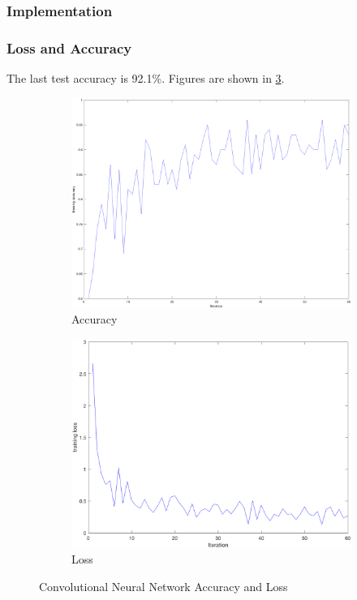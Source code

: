 \subsubsection{Implementation}

\subsubsection{Loss and Accuracy}
The last test accuracy is 92.1\%.
Figures are shown in \ref{fig:27}.
\begin{figure}[htbp]
	\centering
	\begin{subfigure}[t]{0.8\textwidth}
	    \centering
        \includegraphics[width=\textwidth]{hw6/accuracy3.png}
		\caption{Accuracy}\label{fig:27a}
	\end{subfigure}
	\begin{subfigure}[t]{0.8\textwidth}
	    \centering
		\includegraphics[width=\textwidth]{hw6/loss3.png}
		\caption{Loss}\label{fig:27b}
	\end{subfigure}
	\caption{Convolutional Neural Network Accuracy and Loss}\label{fig:27}
\end{figure}

